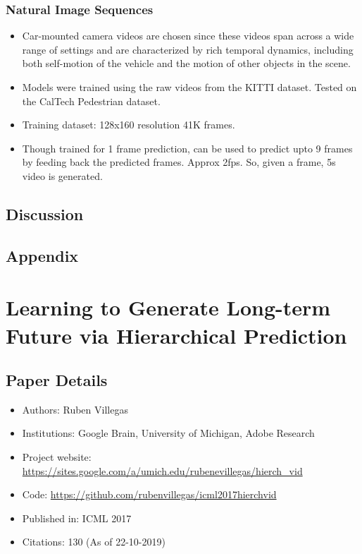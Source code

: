 \documentclass{article}
\begin{document}
    \subsubsection{Natural Image Sequences}\label{subsubsec:Deep_Predictive_Coding_Networks_for_Video_Prediction_and_Unsupervised_Learning:natural-image-sequences}
    \begin{itemize}
        \item Car-mounted camera videos are chosen since these videos span across a wide range of settings and are characterized by rich temporal dynamics, including both self-motion of the vehicle and the motion of other objects in the scene.
        \item Models were trained using the raw videos from the KITTI dataset.
        Tested on the CalTech Pedestrian dataset.
        \item Training dataset: 128x160 resolution 41K frames.
        \item Though trained for 1 frame prediction, can be used to predict upto 9 frames by feeding back the predicted frames.
        Approx 2fps.
        So, given a frame, 5s video is generated.
    \end{itemize}

    \subsection{Discussion}\label{subsec:Deep_Predictive_Coding_Networks_for_Video_Prediction_and_Unsupervised_Learning:discussion}

    \subsection{Appendix}\label{subsec:Deep_Predictive_Coding_Networks_for_Video_Prediction_and_Unsupervised_Learning:appendix}

    \newpage


    \section{Learning to Generate Long-term Future via Hierarchical Prediction}\label{sec:Learning_to_Generate_Long_term_Future_via_Hierarchical_Prediction}
    \subsection*{Paper Details}
    \begin{itemize}
        \item Authors: Ruben Villegas
        \item Institutions: Google Brain, University of Michigan, Adobe Research
        \item Project website: \url{https://sites.google.com/a/umich.edu/rubenevillegas/hierch_vid}
        \item Code: \url{https://github.com/rubenvillegas/icml2017hierchvid}
        \item Published in: ICML 2017
        \item Citations: 130 (As of 22-10-2019)
    \end{itemize}
\end{document}
